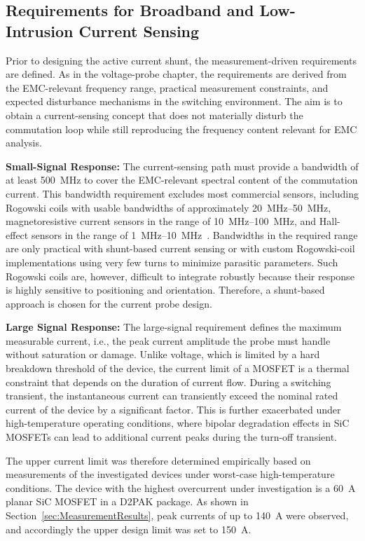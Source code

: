 
\subsection{Requirements for Broadband and Low-Intrusion Current Sensing}

Prior to designing the active current shunt, the measurement-driven requirements are defined.
As in the voltage-probe chapter, the requirements are derived from the EMC-relevant frequency range, practical measurement constraints, and expected disturbance mechanisms in the switching environment.
The aim is to obtain a current-sensing concept that does not materially disturb the commutation loop while still reproducing the frequency content relevant for EMC analysis.

\textbf{Small-Signal Response:}
The current-sensing path must provide a bandwidth of at least \SI{500}{MHz} to cover the EMC-relevant spectral content of the commutation current.
This bandwidth requirement excludes most commercial sensors, including Rogowski coils with usable bandwidths of approximately \SIrange{20}{50}{MHz}, magnetoresistive current sensors in the range of \SIrange{10}{100}{MHz}, and Hall-effect sensors in the range of \SIrange{1}{10}{MHz}~\cite{xin_review_2022}.
Bandwidths in the required range are only practical with shunt-based current sensing or with custom Rogowski-coil implementations using very few turns to minimize parasitic parameters.
Such Rogowski coils are, however, difficult to integrate robustly because their response is highly sensitive to positioning and orientation.
Therefore, a shunt-based approach is chosen for the current probe design.

\textbf{Large Signal Response:}
The large-signal requirement defines the maximum measurable current, i.e., the peak current amplitude the probe must handle without saturation or damage.
Unlike voltage, which is limited by a hard breakdown threshold of the device, the current limit of a MOSFET is a thermal constraint that depends on the duration of current flow.
During a switching transient, the instantaneous current can transiently exceed the nominal rated current of the device by a significant factor.
This is further exacerbated under high-temperature operating conditions, where bipolar degradation effects in SiC MOSFETs can lead to additional current peaks during the turn-off transient.

The upper current limit was therefore determined empirically based on measurements of the investigated devices under worst-case high-temperature conditions.
The device with the highest overcurrent under investigation is a \SI{60}{A} planar SiC MOSFET in a D2PAK package.
As shown in Section~\ref{sec:MeasurementResults}, peak currents of up to \SI{140}{A} were observed, and accordingly the upper design limit was set to \SI{150}{A}.


